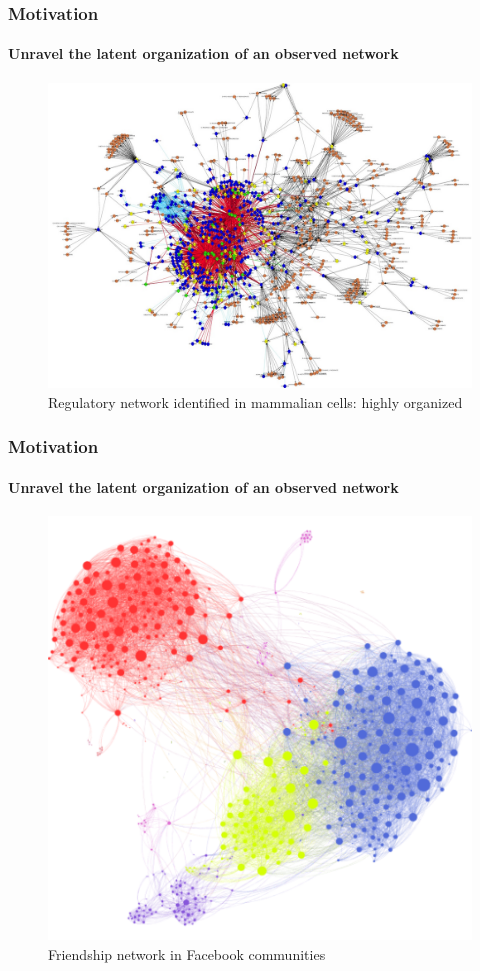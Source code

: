 \documentclass{beamer}\usepackage[]{graphicx}\usepackage[]{color}
\begin{document}
\begin{frame}
  \frametitle{Motivation}
  \framesubtitle{Unravel the latent organization of an observed network}

  \begin{figure}
    \centering
    \includegraphics[width=.8\textwidth]{figures/net_reg_mamalians}
    \caption{\small Regulatory network  identified in mammalian cells:
      \alert{highly organized}}
  \end{figure}
\end{frame}

\begin{frame}
  \frametitle{Motivation}
  \framesubtitle{Unravel the latent organization of an observed network}

  \begin{figure}
    \centering
    \includegraphics[width=.5\textwidth]{figures/facebook_network}
    \caption{\small Friendship network in Facebook
      \alert{communities}}
  \end{figure}
\end{frame}
\end{document}
